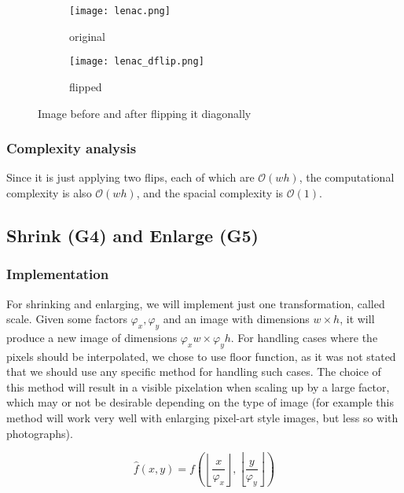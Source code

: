 \documentclass[12pt]{article}
\begin{document}
\begin{figure}[H]\centering
    \begin{subfigure}[t]{\subfiguresize}\centering
        \texttt{[image: lenac.png]}
        \caption{original}
    \end{subfigure}
    \hspace{.05\textwidth}
    \begin{subfigure}[t]{\subfiguresize}\centering
        \texttt{[image: lenac\_dflip.png]}
        \caption{flipped}
    \end{subfigure}
    \caption{Image before and after flipping it diagonally}
\end{figure}

\subsubsection{Complexity analysis}
Since it is just applying two flips, each of which are $\mathcal{O}(wh)$,
the computational complexity is also $\mathcal{O}(wh)$, and the spacial complexity is $\mathcal{O}(1)$.

\vspace{5em}
\pagebreak[3]
\subsection{Shrink (G4) and Enlarge (G5)}

\subsubsection{Implementation}

For shrinking and enlarging, we will implement just one transformation, called scale.
Given some factors $\varphi_x, \varphi_y$ and an image with dimensions $w \times h$,
it will produce a new image of dimensions $\varphi_x w \times \varphi_y h$.
For handling cases where the pixels should be interpolated,
we chose to use floor function,
as it was not stated that we should use any specific method for handling such cases.
The choice of this method will result in a visible pixelation when scaling up by a large factor,
which may or not be desirable depending on the type of image
(for example this method will work very well with enlarging pixel-art style images, but less so with photographs).

\begin{equation}
    \hat{f}(x,y) =
    f\left(
    \left\lfloor
    \frac{x}{\varphi_x}
    \right\rfloor,
    \left\lfloor
    \frac{y}{\varphi_y}
    \right\rfloor
    \right)
\end{equation}
\end{document}

